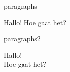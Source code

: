 \begin{saveblock}{paragraphs}
    \begin{highlightblock}[linewidth=0.5\textwidth,gobble=8]
        Hallo!
        Hoe gaat het? 
    \end{highlightblock}
\end{saveblock}

\begin{saveblock}{paragraphs2}
    \begin{highlightblock}[linewidth=0.5\textwidth,gobble=8]
        Hallo!\\
        Hoe gaat het? 
    \end{highlightblock}
\end{saveblock}


    

    



